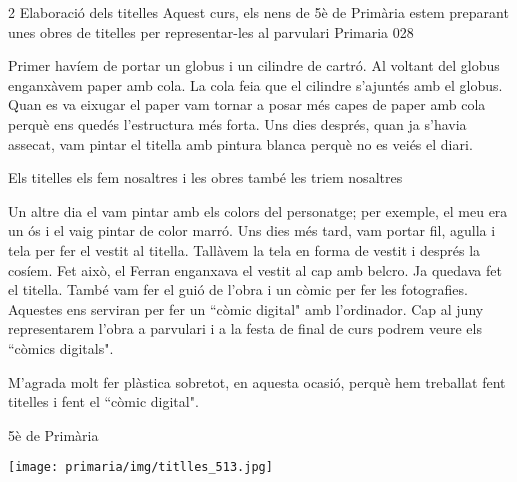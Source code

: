 \begin{news}
{2} %
{Elaboració dels titelles}
{Aquest curs, els nens de 5è de Primària estem preparant unes obres de titelles per representar-les al parvulari}
{Primaria}
{028} %




Primer havíem de portar un globus i un cilindre de cartró. Al voltant del globus enganxàvem paper amb cola. La cola feia que el cilindre s’ajuntés amb el globus. Quan es va eixugar el paper vam tornar a posar més capes de paper amb cola perquè ens quedés l’estructura més forta. Uns dies després, quan ja s’havia assecat, vam pintar el titella amb pintura blanca perquè no es veiés el diari. 

{Els titelles els fem nosaltres i les obres també les triem nosaltres}

Un altre dia el vam pintar amb els colors del personatge; per exemple, el meu  era un ós i el vaig pintar de color marró. Uns dies més tard, vam portar fil, agulla i tela per fer el vestit al titella. Tallàvem la tela en forma de vestit i després la cosíem. Fet això, el Ferran enganxava el vestit al cap amb belcro. Ja quedava fet el titella. També vam fer el guió de l’obra i un còmic per fer les fotografies. Aquestes ens serviran per fer un ``còmic digital" amb l’ordinador. Cap al juny representarem l’obra a parvulari i a la festa de final de curs podrem veure els ``còmics digitals".


M’agrada molt fer plàstica  sobretot, en aquesta ocasió, perquè hem treballat fent titelles i fent el ``còmic digital".

{5è de Primària}

\noindent\texttt{[image: primaria/img/titlles\_513.jpg]}

\end{news}

